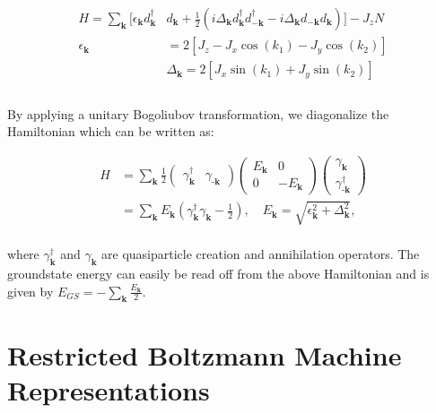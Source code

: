 \documentclass{article}
\begin{document}
\begin{equation}\label{eq:16}
	\begin{aligned}
		H = \sum_\textbf{k}[\epsilon_\textbf{k}d^\dagger_{\textbf{k}}&d_{\textbf{k}} + \frac{1}{2}(i\Delta_\textbf{k}d^\dagger_{\textbf{k}}d^\dagger_{-\textbf{k}}-i\Delta_\textbf{k}d_{-\textbf{k}}d_{\textbf{k}})]-J_zN\\
		\epsilon_\textbf{k} &= 2[J_z-J_x\cos(k_1)-J_y\cos(k_2)]\\
		&\Delta_\textbf{k} = 2[J_x\sin(k_1)+J_y\sin(k_2)]\\
	\end{aligned}
\end{equation}\\

\noindent By applying a unitary Bogoliubov transformation, we diagonalize the Hamiltonian which can be written as:

\begin{equation}\label{eq:17}
	\begin{aligned}
		H &= \sum_\textbf{k} \frac{1}{2} 
		\begin{pmatrix}
			\gamma^\dagger_\textbf{k} & \gamma_{\textbf{-k}}
		\end{pmatrix}
		\begin{pmatrix}
			E_\textbf{k} & 0\\
			0 & -E_\textbf{k}
		\end{pmatrix}
		\begin{pmatrix} \gamma_\textbf{k} \\ \gamma^\dagger_{\textbf{-k}} \end{pmatrix}\\
		&= \sum_\textbf{k}E_\textbf{k}(\gamma^\dagger_\textbf{k}\gamma_{\textbf{k}}-\frac{1}{2}), \quad E_{\mathbf{k}} = \sqrt{\epsilon_{\mathbf{k}}^2 + \Delta_{\mathbf{k}}^2},
	\end{aligned}
\end{equation}\\

\noindent where $\gamma^{\dagger}_{\mathbf{k}}$ and $\gamma_{\mathbf{k}}$ are quasiparticle creation and annihilation operators. The groundstate energy can easily be read off from the above Hamiltonian and is given by $E_{GS} = -\sum_{\mathbf{k}}\frac{E_\textbf{k}}{2}$.

\section{Restricted Boltzmann Machine Representations}\label{sec3}
\end{document}

